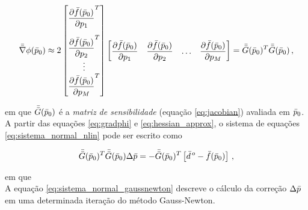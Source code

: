 \begin{equation}
\mat{\nabla}\phi(\vect{p}_0) \approx
    2
    \begin{bmatrix}
    \dfrac{\partial\vect{f}(\vect{p}_0)}{\partial p_1}^T \vspace{0.3cm}\\
    \dfrac{\partial\vect{f}(\vect{p}_0)}{\partial p_2}^T \\
    \vdots \\
    \dfrac{\partial\vect{f}(\vect{p}_0)}{\partial p_M}^T
    \end{bmatrix}
    \begin{bmatrix}
    \dfrac{\partial\vect{f}(\vect{p}_0)}{\partial p_1} &
    \dfrac{\partial\vect{f}(\vect{p}_0)}{\partial p_2} &
    \ldots &
    \dfrac{\partial\vect{f}(\vect{p}_0)}{\partial p_M}
    \end{bmatrix}
    =
    \mat{G}(\vect{p}_0)^T\mat{G}(\vect{p}_0) \thinspace ,
\label{eq:hessian_approx}
\end{equation}

\noindent em que $\bar{\bar{G}}(\bar{p}_0)$ é a {\it matriz de sensibilidade}
(equação \ref{eq:jacobian}) avaliada em $\bar{p}_0$.
\\
\indent A partir das equações \ref{eq:gradphi} e \ref{eq:hessian_approx}, o
sistema de equações \ref{eq:sistema_normal_nlin} pode ser escrito como

\begin{equation}
    \bar{\bar{G}}(\bar{p}_0)^T\bar{\bar{G}}(\bar{p}_0)\Delta\bar{p} =
        -\bar{\bar{G}}(\bar{p}_0)^T \left[
            \bar{d}^{\thinspace o} - \bar{f}(\bar{p}_0) \right]
    \thinspace ,
\label{eq:sistema_normal_gaussnewton}
\end{equation}

\noindent em que
\\
\indent A equação \ref{eq:sistema_normal_gaussnewton} descreve o cálculo da correção
$\Delta\bar{p}$ em uma determinada iteração do método Gauss-Newton.

